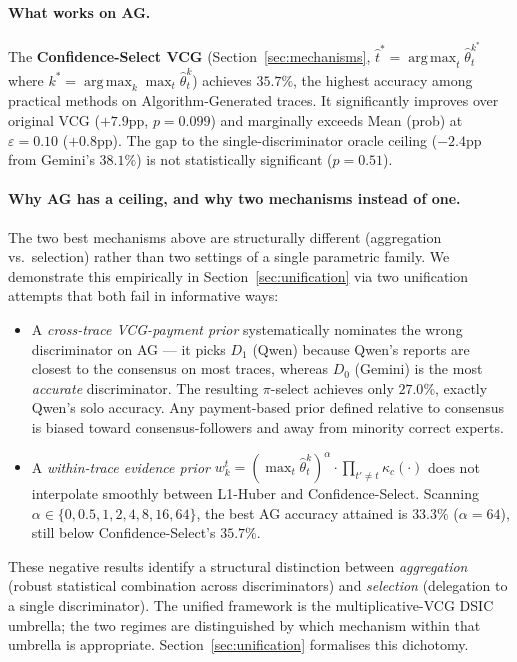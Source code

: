 \documentclass[11pt]{article}
\DeclareMathOperator*{\argmax}{arg\,max}
\newcommand{\thetahat}{\hat{\theta}}
\begin{document}
\paragraph{What works on AG.}
The \textbf{Confidence-Select VCG} (Section~\ref{sec:mechanisms},
$\hat t^* = \argmax_t \thetahat^{k^*}_t$ where
$k^* = \argmax_k \max_t \thetahat^k_t$) achieves $35.7\%$, the highest
accuracy among practical methods on Algorithm-Generated traces. It
significantly improves over original VCG ($+7.9$pp, $p = 0.099$) and
marginally exceeds Mean (prob) at $\varepsilon = 0.10$ ($+0.8$pp). The
gap to the single-discriminator oracle ceiling ($-2.4$pp from Gemini's
$38.1\%$) is not statistically significant ($p = 0.51$).

\paragraph{Why AG has a ceiling, and why two mechanisms instead of one.}
The two best mechanisms above are structurally different (aggregation vs.\
selection) rather than two settings of a single parametric family. We
demonstrate this empirically in Section~\ref{sec:unification} via two
unification attempts that both fail in informative ways:
\begin{itemize}[nosep, leftmargin=*]
\item A \emph{cross-trace VCG-payment prior} systematically nominates the
wrong discriminator on AG --- it picks $D_1$ (Qwen) because Qwen's reports
are closest to the consensus on most traces, whereas $D_0$ (Gemini) is the
most \emph{accurate} discriminator. The resulting $\pi$-select achieves
only $27.0\%$, exactly Qwen's solo accuracy. Any payment-based prior
defined relative to consensus is biased toward consensus-followers and
away from minority correct experts.
\item A \emph{within-trace evidence prior}
$w_k^t = (\max_t \thetahat^k_t)^\alpha \cdot \prod_{t' \neq t} \kappa_c(\cdot)$
does not interpolate smoothly between L1-Huber and Confidence-Select.
Scanning $\alpha \in \{0, 0.5, 1, 2, 4, 8, 16, 64\}$, the best AG accuracy
attained is $33.3\%$ ($\alpha = 64$), still below Confidence-Select's
$35.7\%$.
\end{itemize}
These negative results identify a structural distinction between
\emph{aggregation} (robust statistical combination across discriminators)
and \emph{selection} (delegation to a single discriminator). The unified
framework is the multiplicative-VCG DSIC umbrella; the two regimes are
distinguished by which mechanism within that umbrella is appropriate.
Section~\ref{sec:unification} formalises this dichotomy.
\end{document}
